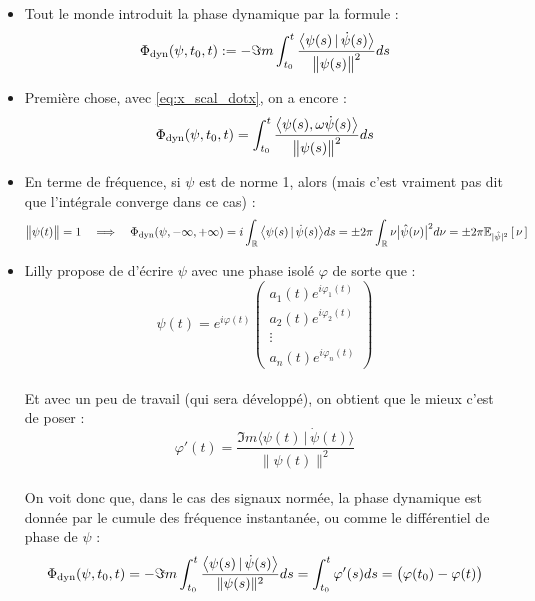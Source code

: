 \begin{itemize}
	
	\item Tout le monde introduit la phase dynamique par la formule :
	\begin{equation}\label{eq:phase_dyn}
		\phased(\psi,t_0,t) \defeq -\Im m \int_{t_0}^t\frac{\big\langle \psi(s) \, |\, \dot{\psi}(s) \big\rangle}{\big\|\psi(s)\big\|^2} ds
	\end{equation}
	
	\item Première chose, avec \eqref{eq:x_scal_dotx}, on a encore :
	\[\phased(\psi,t_0,t) = \int_{t_0}^t\frac{\big\langle \psi(s), \omega\dot{\psi}(s) \big\rangle}{\big\|\psi(s)\big\|^2} ds\]
	
	\item En terme de fréquence, si $\psi$ est de norme 1, alors (mais c'est vraiment pas dit que l'intégrale converge dans ce cas) :
	\[\big\|\psi(t)\big\|=1\quad \Lr\quad \phased(\psi, -\infty, +\infty) = i\int_\R \big\langle \psi(s) \, |\, \dot{\psi}(s) \big\rangle ds = \pm 2\pi\int_\R \nu\big|\hat{\psi}(\nu)\big|^2 d\nu = \pm 2\pi \esp[|\hat{\psi}|^2]{\nu}\]
	
	\item Lilly \cite{lilly_analysis_2012} propose de d'écrire $\psi$ avec une phase isolé $\varphi$ de sorte que :
	\[\psi(t) = e^{i\varphi(t)}\begin{pmatrix} a_1(t)e^{i\varphi_1(t)} \\ a_2(t)e^{i\varphi_2(t)} \\ \vdots \\ a_n(t)e^{i\varphi_n(t)}
	\end{pmatrix}\]
	\\
	Et avec un peu de travail (qui sera développé), on obtient que le mieux c'est de poser :
	\[\varphi'(t) = \frac{\Im m\big\langle \psi(t) \,|\, \dot{\psi}(t) \big\rangle}{\|\psi(t)\|^2}\]
	\\
	On voit donc que, dans le cas des signaux normée, la phase dynamique est donnée par le cumule des fréquence instantanée, ou comme le différentiel de phase de $\psi$ :
	\[\phased(\psi,t_0,t) = -\Im m\int_{t_0}^t \frac{\big\langle \psi(s) \,|\, \dot{\psi}(s) \big\rangle}{\|\psi(s)\|^2} ds = \int_{t_0}^t \varphi'(s)ds = \big(\varphi(t_0)-\varphi(t)\big)\]
	

\end{itemize}
